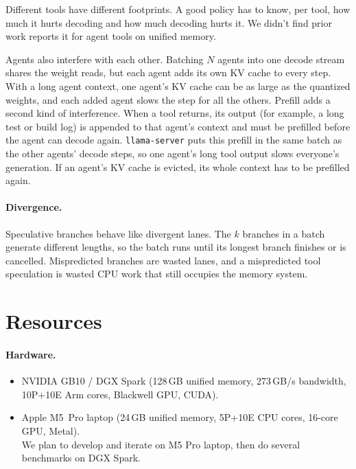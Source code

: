 \documentclass[11pt]{article}
\newcommand{\code}[1]{\texttt{#1}}
\begin{document}
Different tools have different footprints. A good policy
has to know, per tool, how much it hurts decoding and how much decoding hurts
it. We didn't find prior work reports it for agent tools on unified memory.

Agents also interfere with each other. Batching $N$ agents into one decode
stream shares the weight reads, but each agent adds its own KV cache to every
step. With a long agent context, one agent's KV cache can be as large as the
quantized weights, and each added agent slows the step for all the others. Prefill adds a second kind of
interference. When a tool returns, its output (for example, a long test or
build log) is appended to that agent's context and must be prefilled before the
agent can decode again. \code{llama-server} puts this prefill in the same batch
as the other agents' decode steps, so one agent's long tool output slows
everyone's generation. If an agent's KV cache is evicted, its whole context has to be prefilled again.

\paragraph{Divergence.}
Speculative branches behave like divergent lanes. The $k$ branches in a batch
generate different lengths, so the batch runs until its longest branch
finishes or is cancelled. Mispredicted branches are wasted lanes, and a
mispredicted tool speculation is wasted CPU work that still occupies the
memory system.

\section*{Resources}

\paragraph{Hardware.}
\begin{itemize}
  \item NVIDIA GB10 / DGX Spark (128\,GB unified memory, 273\,GB/s bandwidth, 10P+10E Arm cores, Blackwell GPU, CUDA). 
  \item Apple M5~Pro laptop (24\,GB unified memory, 5P+10E CPU cores, 16-core GPU, Metal).
  \\
  We plan to develop and iterate on M5 Pro laptop, then do several benchmarks on DGX Spark.
\end{itemize}
\end{document}
